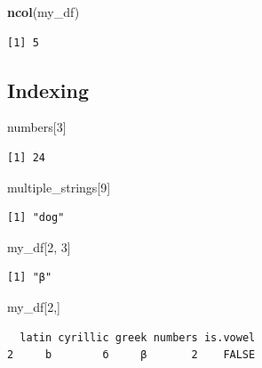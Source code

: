 \documentclass[]{book}
\newenvironment{Shaded}{\begin{snugshade}}{\end{snugshade}}
\newcommand{\KeywordTok}[1]{\textcolor[rgb]{0.13,0.29,0.53}{\textbf{#1}}}
\newcommand{\DecValTok}[1]{\textcolor[rgb]{0.00,0.00,0.81}{#1}}
\newcommand{\NormalTok}[1]{#1}
\theoremstyle{definition}
\theoremstyle{definition}
\theoremstyle{definition}
\theoremstyle{remark}
\begin{document}
\begin{Shaded}
\begin{Highlighting}[]
\KeywordTok{ncol}\NormalTok{(my_df)}
\end{Highlighting}
\end{Shaded}

\begin{verbatim}
[1] 5
\end{verbatim}

\subsection{Indexing}\label{indexing}

\begin{Shaded}
\begin{Highlighting}[]
\NormalTok{numbers[}\DecValTok{3}\NormalTok{]}
\end{Highlighting}
\end{Shaded}

\begin{verbatim}
[1] 24
\end{verbatim}

\begin{Shaded}
\begin{Highlighting}[]
\NormalTok{multiple_strings[}\DecValTok{9}\NormalTok{]}
\end{Highlighting}
\end{Shaded}

\begin{verbatim}
[1] "dog"
\end{verbatim}

\begin{Shaded}
\begin{Highlighting}[]
\NormalTok{my_df[}\DecValTok{2}\NormalTok{, }\DecValTok{3}\NormalTok{]}
\end{Highlighting}
\end{Shaded}

\begin{verbatim}
[1] "β"
\end{verbatim}

\begin{Shaded}
\begin{Highlighting}[]
\NormalTok{my_df[}\DecValTok{2}\NormalTok{,]}
\end{Highlighting}
\end{Shaded}

\begin{verbatim}
  latin cyrillic greek numbers is.vowel
2     b        б     β       2    FALSE
\end{verbatim}
\end{document}
